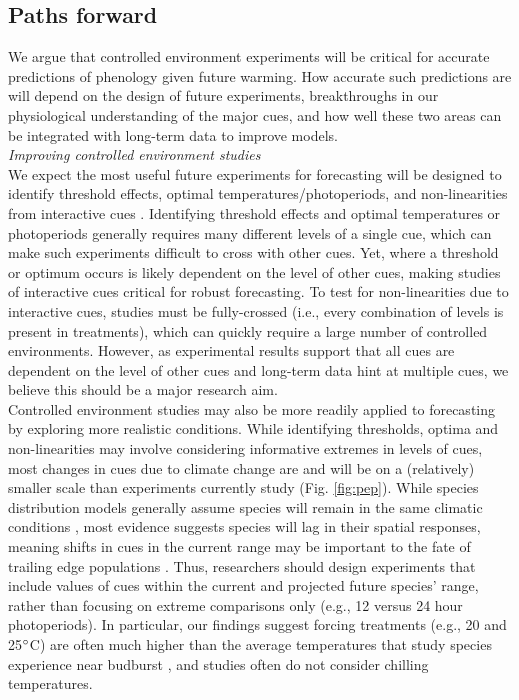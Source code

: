 \documentclass[11pt,letter]{article}
\begin{document}
\subsection{Paths forward} 
We argue that controlled environment experiments will be critical for accurate predictions of phenology given future warming. How accurate such predictions are will depend on the design of future experiments, breakthroughs in our physiological understanding of the major cues, and how well these two areas can be integrated with long-term data to improve models. \\

\emph{Improving controlled environment studies}\\
We expect the most useful future experiments for forecasting will be designed to identify threshold effects, optimal temperatures/photoperiods, and non-linearities from interactive cues \citep{Caffarra:2011b,Caffarra:2011qf}. Identifying threshold effects and optimal temperatures or photoperiods generally requires many different levels of a single cue, which can make such experiments difficult to cross with other cues. Yet, where a threshold or optimum occurs is likely dependent on the level of other cues, making studies of interactive cues critical for robust forecasting. To test for non-linearities due to interactive cues, studies must be fully-crossed (i.e., every combination of levels is present in treatments), which can quickly require a large number of controlled environments. However, as experimental results support that all cues are dependent on the level of other cues \citep{stearns1958,flynn2018} and long-term data hint at multiple cues, we believe this should be a major research aim.\\

Controlled environment studies may also be more readily applied to forecasting by exploring more realistic conditions. While identifying thresholds, optima and non-linearities may involve considering informative extremes in levels of cues, most changes in cues due to climate change are and will be on a (relatively) smaller scale than experiments currently study (Fig. \ref{fig:pep}). While species distribution models generally assume species will remain in the same climatic conditions \citep{elith2009species}, most evidence suggests species will lag in their spatial responses, meaning shifts in cues in the current range may be important to the fate of trailing edge populations \citep{bertrand2011changes,lenoir2015climate,savage2015elevational}. Thus, researchers should design experiments that include values of cues within the current and projected future species' range, rather than focusing on extreme comparisons only (e.g., 12 versus 24 hour photoperiods). In particular, our findings suggest forcing treatments (e.g., 20 and 25$\degree$C) are often much higher than the average temperatures that study species experience near budburst \citep{fu2015,gusewell2017}, and studies often do not consider chilling temperatures. \\ %
\end{document}
